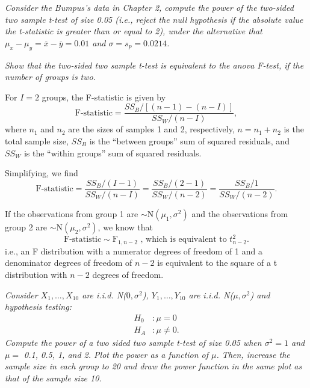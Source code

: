 \documentclass[11pt]{exam} %
\begin{document}
\begin{questions}







\titledquestion{} %
\textit{Consider the Bumpus’s data in Chapter 2, compute the power of the two-sided two sample t-test of size 0.05 (i.e., reject the null hypothesis if the absolute value the t-statistic is greater than or equal to 2), under the alternative that $\mu_x - \mu_y = \overline{x} - \overline{y} = 0.01$ and $\sigma = s_p = 0.0214$.}



\titledquestion{} %
\textit{Show that the two-sided two sample t-test is equivalent to the anova F-test, if the number of groups is two.}


For $I=2$ groups, the F-statistic is given by
$$ \text{F-statistic} =  \frac{SS_B / \left[ (n-1) - (n-I) \right]}{SS_W / (n-I)}, $$
where $n_1$ and $n_2$ are the sizes of samples 1 and 2, respectively, $n=n_1+n_2$ is the total sample size, $SS_B$ is the ``between groups'' sum of squared residuals, and $SS_W$ is the ``within groups'' sum of squared residuals.

Simplifying, we find
$$\text{F-statistic} =  \frac{SS_B / (I-1) }{SS_W / (n-I)} = \frac{SS_B / (2-1) }{SS_W / (n-2)} = \frac{SS_B / 1 }{SS_W / (n-2)}.$$

If the observations from group 1 are $\sim \text{N}(\mu_1, \sigma^2)$ and the observations from group 2 are $\sim \text{N}(\mu_2, \sigma^2)$, we know that
$$\text{F-statistic} \sim \text{F}_{1, n-2} \text{ , which is equivalent to }t^2_{n-2}.$$
i.e., an F distribution with a numerator degrees of freedom of 1 and a denominator degrees of freedom of $n-2$ is equivalent to the square of a t distribution with $n-2$ degrees of freedom.



\titledquestion{} %
\textit{Consider $X_1,\ldots,X_{10}$ are i.i.d. N($0,\sigma^2$), $Y_1,\ldots,Y_{10}$ are i.i.d. N($\mu,\sigma^2$) and hypothesis testing:}
\begin{align*}
H_0 &: \mu = 0\\
H_A &: \mu \neq 0.
\end{align*}
\textit{Compute the power of a two sided two sample t-test of size 0.05 when $\sigma^2 = 1$ and $\mu =$ 0.1, 0.5, 1, and 2. Plot the power as a function of $\mu$. Then, increase the sample size in each group to 20 and draw the power function in the same plot as that of the sample size 10.}




\end{questions}
\end{document}
